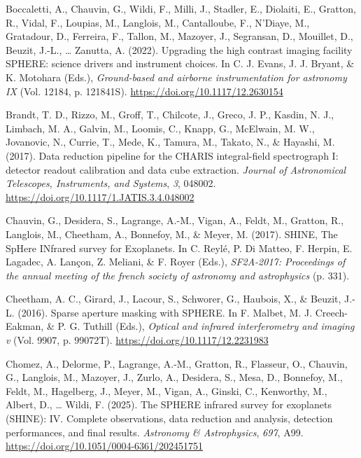 \documentclass[
]{article}
\newlength{\cslhangindent}
\newenvironment{CSLReferences}[2] %
 {\begin{list}{}{%
  \setlength{\itemindent}{0pt}
  \setlength{\leftmargin}{0pt}
  \setlength{\parsep}{0pt}
  \ifodd #1
   \setlength{\leftmargin}{\cslhangindent}
   \setlength{\itemindent}{-1\cslhangindent}
  \fi
  \setlength{\itemsep}{#2\baselineskip}}}
 {\end{list}}
\begin{document}
\begin{CSLReferences}{1}{0}
Boccaletti, A., Chauvin, G., Wildi, F., Milli, J., Stadler, E.,
Diolaiti, E., Gratton, R., Vidal, F., Loupias, M., Langlois, M.,
Cantalloube, F., N'Diaye, M., Gratadour, D., Ferreira, F., Tallon, M.,
Mazoyer, J., Segransan, D., Mouillet, D., Beuzit, J.-L., \ldots{}
Zanutta, A. (2022). {Upgrading the high contrast imaging facility
SPHERE: science drivers and instrument choices}. In C. J. Evans, J. J.
Bryant, \& K. Motohara (Eds.), \emph{Ground-based and airborne
instrumentation for astronomy IX} (Vol. 12184, p. 121841S).
\url{https://doi.org/10.1117/12.2630154}

Brandt, T. D., Rizzo, M., Groff, T., Chilcote, J., Greco, J. P., Kasdin,
N. J., Limbach, M. A., Galvin, M., Loomis, C., Knapp, G., McElwain, M.
W., Jovanovic, N., Currie, T., Mede, K., Tamura, M., Takato, N., \&
Hayashi, M. (2017). {Data reduction pipeline for the CHARIS
integral-field spectrograph I: detector readout calibration and data
cube extraction}. \emph{Journal of Astronomical Telescopes, Instruments,
and Systems}, \emph{3}, 048002.
\url{https://doi.org/10.1117/1.JATIS.3.4.048002}

Chauvin, G., Desidera, S., Lagrange, A.-M., Vigan, A., Feldt, M.,
Gratton, R., Langlois, M., Cheetham, A., Bonnefoy, M., \& Meyer, M.
(2017). {SHINE, The SpHere INfrared survey for Exoplanets}. In C. Reylé,
P. Di Matteo, F. Herpin, E. Lagadec, A. Lançon, Z. Meliani, \& F. Royer
(Eds.), \emph{SF2A-2017: Proceedings of the annual meeting of the french
society of astronomy and astrophysics} (p. 331).

Cheetham, A. C., Girard, J., Lacour, S., Schworer, G., Haubois, X., \&
Beuzit, J.-L. (2016). {Sparse aperture masking with SPHERE}. In F.
Malbet, M. J. Creech-Eakman, \& P. G. Tuthill (Eds.), \emph{Optical and
infrared interferometry and imaging v} (Vol. 9907, p. 99072T).
\url{https://doi.org/10.1117/12.2231983}

Chomez, A., Delorme, P., Lagrange, A.-M., Gratton, R., Flasseur, O.,
Chauvin, G., Langlois, M., Mazoyer, J., Zurlo, A., Desidera, S., Mesa,
D., Bonnefoy, M., Feldt, M., Hagelberg, J., Meyer, M., Vigan, A.,
Ginski, C., Kenworthy, M., Albert, D., \ldots{} Wildi, F. (2025). {The
SPHERE infrared survey for exoplanets (SHINE): IV. Complete
observations, data reduction and analysis, detection performances, and
final results}. \emph{Astronomy \& Astrophysics}, \emph{697}, A99.
\url{https://doi.org/10.1051/0004-6361/202451751}


\end{CSLReferences}
\end{document}
